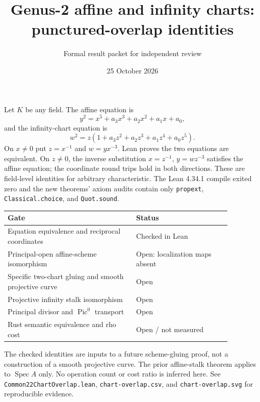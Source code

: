 \documentclass[11pt]{article}
\title{Genus-2 affine and infinity charts: punctured-overlap identities}
\author{Formal result packet for independent review}
\date{25 October 2026}
\begin{document}
\maketitle
Let $K$ be any field. The affine equation is
\[y^2=x^5+a_3x^3+a_2x^2+a_1x+a_0,\]
and the infinity-chart equation is
\[w^2=z(1+a_3z^2+a_2z^3+a_1z^4+a_0z^5).\]
On $x\ne0$ put $z=x^{-1}$ and $w=yx^{-3}$. Lean proves the two equations are equivalent. On $z\ne0$, the inverse substitution $x=z^{-1}$, $y=wz^{-3}$ satisfies the affine equation; the coordinate round trips hold in both directions. These are field-level identities for arbitrary characteristic. The Lean 4.34.1 compile exited zero and the new theorems' axiom audits contain only \texttt{propext}, \texttt{Classical.choice}, and \texttt{Quot.sound}.

\begin{center}\begin{tabular}{p{0.50\linewidth}p{0.37\linewidth}}\toprule
Gate & Status\\\midrule
Equation equivalence and reciprocal coordinates & Checked in Lean\\
Principal-open affine-scheme isomorphism & Open: localization maps absent\\
Specific two-chart gluing and smooth projective curve & Open\\
Projective infinity stalk isomorphism & Open\\
Principal divisor and $\operatorname{Pic}^0$ transport & Open\\
Rust semantic equivalence and rho cost & Open / not measured\\\bottomrule\end{tabular}\end{center}

\noindent The checked identities are inputs to a future scheme-gluing proof, not a construction of a smooth projective curve. The prior affine-stalk theorem applies to $\operatorname{Spec}A$ only. No operation count or cost ratio is inferred here. See \texttt{Common22ChartOverlap.lean}, \texttt{chart-overlap.csv}, and \texttt{chart-overlap.svg} for reproducible evidence.
\end{document}
